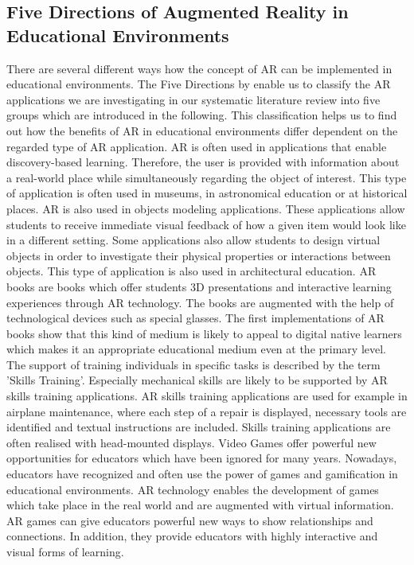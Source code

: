 \subsection{Five Directions of Augmented Reality in Educational Environments}
There are several different ways how the concept of AR can be implemented in educational environments. \autocite {Yuen.2011}\mulcit\autocite {Lee.2012} The Five Directions by \cite{Yuen.2011} enable us to classify the AR applications we are investigating in our systematic literature review into five groups which are introduced in the following. This classification helps us to find out how the benefits of AR in educational environments differ dependent on the regarded type of AR application.
\heading{\DBL}
AR is often used in applications that enable discovery-based learning. Therefore, the user is provided with information about a real-world place while simultaneously regarding the object of interest. This type of application is often used in museums, in astronomical education or at historical places.
\heading{\OM}
AR is also used in objects modeling applications. These applications allow students to receive immediate visual feedback of how a given item would look like in a different setting. Some applications also allow students to design virtual objects in order to investigate their physical properties or interactions between objects. This type of application is also used in architectural education.
\heading{\ARB}
AR books are books which offer students 3D presentations and interactive learning experiences through AR technology. The books are augmented with the help of technological devices such as special glasses. The first implementations of AR books show that this kind of medium is likely to appeal to digital native learners which makes it an appropriate educational medium even at the primary level.
\heading{\ST}
The support of training individuals in specific tasks is described by the term 'Skills Training'. Especially mechanical skills are likely to be supported by AR skills training applications. AR skills training applications are used for example in airplane maintenance, where each step of a repair is displayed, necessary tools are identified and textual instructions are included. Skills training applications are often realised with head-mounted displays. 
\heading{\ARG}
Video Games offer powerful new opportunities for educators which have been ignored for many years. \autocite{Squire.2003} %
Nowadays, educators have recognized and often use the power of games and gamification in educational environments. AR technology enables the development of games which take place in the real world and are augmented with virtual information. AR games can give educators powerful new ways to show relationships and connections. In addition, they provide educators with highly interactive and visual forms of learning.